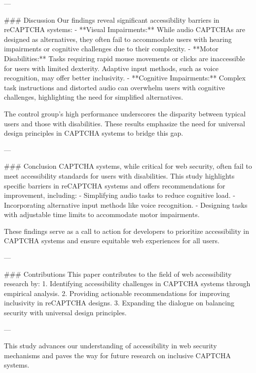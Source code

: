 ---

### Discussion
Our findings reveal significant accessibility barriers in reCAPTCHA systems:
- **Visual Impairments:** While audio CAPTCHAs are designed as alternatives, they often fail to accommodate users with hearing impairments or cognitive challenges due to their complexity.
- **Motor Disabilities:** Tasks requiring rapid mouse movements or clicks are inaccessible for users with limited dexterity. Adaptive input methods, such as voice recognition, may offer better inclusivity.
- **Cognitive Impairments:** Complex task instructions and distorted audio can overwhelm users with cognitive challenges, highlighting the need for simplified alternatives.

The control group’s high performance underscores the disparity between typical users and those with disabilities. These results emphasize the need for universal design principles in CAPTCHA systems to bridge this gap.

---

### Conclusion
CAPTCHA systems, while critical for web security, often fail to meet accessibility standards for users with disabilities. This study highlights specific barriers in reCAPTCHA systems and offers recommendations for improvement, including:
- Simplifying audio tasks to reduce cognitive load.
- Incorporating alternative input methods like voice recognition.
- Designing tasks with adjustable time limits to accommodate motor impairments.

These findings serve as a call to action for developers to prioritize accessibility in CAPTCHA systems and ensure equitable web experiences for all users.

---

### Contributions
This paper contributes to the field of web accessibility research by:
1. Identifying accessibility challenges in CAPTCHA systems through empirical analysis.
2. Providing actionable recommendations for improving inclusivity in reCAPTCHA designs.
3. Expanding the dialogue on balancing security with universal design principles.

--- 

This study advances our understanding of accessibility in web security mechanisms and paves the way for future research on inclusive CAPTCHA systems.